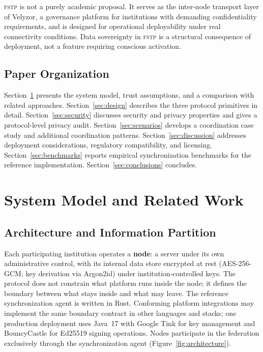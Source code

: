 \documentclass[12pt]{article}
\newcommand{\FSTP}{\textsc{fstp}}
\begin{document}
	\FSTP{} is not a purely academic proposal. It serves as the inter-node
	transport layer of Velyzor, a governance platform for institutions with
	demanding confidentiality requirements, and is designed for
	operational deployability under real connectivity conditions. Data
	sovereignty in \FSTP{} is a structural consequence of deployment, not
	a feature requiring conscious activation.
	
	\subsection{Paper Organization}
	
	Section~\ref{sec:overview} presents the system model, trust
	assumptions, and a comparison with related approaches.
	Section~\ref{sec:design} describes the three protocol primitives in
	detail. Section~\ref{sec:security} discusses security and privacy
	properties and gives a protocol-level privacy audit.
	Section~\ref{sec:scenarios} develops a coordination case study and
	additional coordination patterns. Section~\ref{sec:discussion}
	addresses deployment considerations, regulatory compatibility, and
	licensing. Section~\ref{sec:benchmarks} reports empirical
	synchronization benchmarks for the reference implementation.
	Section~\ref{sec:conclusions} concludes.
	
	
	\section{System Model and Related Work}
	\label{sec:overview}
	
	\subsection{Architecture and Information Partition}
	
	Each participating institution operates a \textbf{node}: a server
	under its own administrative control, with its internal data store
	encrypted at rest (AES-256-GCM; key derivation via Argon2id) under
	institution-controlled keys. The protocol does not constrain what
	platform runs inside the node; it defines the boundary between what
	stays inside and what may leave. The reference synchronization agent
	is written in Rust. Conforming platform integrations may implement the
	same boundary contract in other languages and stacks; one production
	deployment uses Java~17 with Google Tink for key management and
	BouncyCastle for Ed25519 signing operations. Nodes participate in the
	federation exclusively through the synchronization agent
	(Figure~\ref{fig:architecture}).
	
\end{document}
